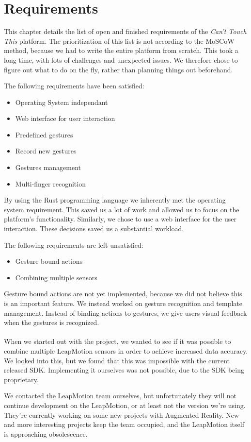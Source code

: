 \documentclass{standalone}
\begin{document}
  \section{Requirements}
  This chapter details the list of open and finished requirements of the
  \textit{Can't Touch This} platform. The prioritization of this list is not
  according to the MoSCoW method, because we had to write the entire platform
  from scratch. This took a long time, with lots of challenges and unexpected
  issues. We therefore chose to figure out what to do on the fly, rather than
  planning things out beforehand.

  The following requirements have been satisfied:
  \begin{itemize}
    \tightlist{}
    \item Operating System independant
    \item Web interface for user interaction
    \item Predefined gestures
    \item Record new gestures
    \item Gestures management
    \item Multi-finger recognition
  \end{itemize}
  By using the Rust programming language we inherently met the operating system
  requirement. This saved us a lot of work and allowed us to focus on the
  platform's functionality. Similarly, we chose to use a web interface for the
  user interaction. These decisions saved us a substantial workload.

  The following requirements are left unsatisfied:
  \begin{itemize}
    \tightlist{}
    \item Gesture bound actions
    \item Combining multiple sensors
  \end{itemize}
  Gesture bound actions are not yet implemented, because we did not believe this
  is an important feature. We instead worked on gesture recognition and template
  management. Instead of binding actions to gestures, we give users visual
  feedback when the gestures is recognized.

  \paragraph{}
  When we started out with the project, we wanted to see if it was possible to
  combine multiple LeapMotion sensors in order to achieve increased data
  accuracy. We looked into this, but we found that this was impossible with the
  current released SDK. Implementing it ourselves was not possible, due to
  the SDK being proprietary.

  We contacted the LeapMotion team ourselves, but unfortunately they will not
  continue development on the LeapMotion, or at least not the version we're
  using. They're currently working on some new projects with Augmented Reality.
  New and more interesting projects keep the team occupied,
  and the LeapMotion itself is approaching obsolescence.

  \clearpage
\end{document}
